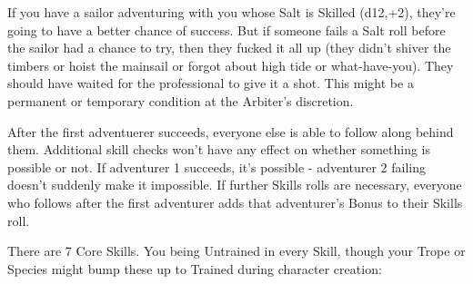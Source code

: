 {  If you have a sailor adventuring with you whose Salt is Skilled (d12,+2), they're going to have a better chance of success.  But if someone fails a Salt roll before the sailor had a chance to try, then they fucked it all up (they didn't shiver the timbers or hoist the mainsail or forgot about high tide or what-have-you).  They should have waited for the professional to give it a shot.  This might be a permanent or temporary condition at the Arbiter's discretion.

  After the first adventuerer succeeds, everyone else is able to follow along behind them.  Additional skill checks won't have any effect on whether something is possible or not.  If adventurer 1 succeeds, it's possible - adventurer 2 failing doesn't suddenly make it impossible.  If further Skills rolls are necessary, everyone who follows after the first adventurer adds that adventurer's Bonus to their Skills roll.

 

  There are 7 Core Skills.  You being Untrained in every Skill, though your Trope or Species might bump these up to Trained during character creation:





}
